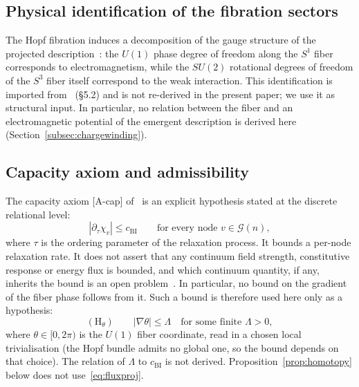 \documentclass[11pt,a4paper]{article}
\begin{document}
    \subsection{Physical identification of the fibration sectors}

      The Hopf fibration induces a decomposition of the gauge structure
      of the projected description~\cite{Cosmochrony}:
      the $U(1)$ phase degree of freedom along the $S^1$ fiber
      corresponds to electromagnetism,
      while the $SU(2)$ rotational degrees of freedom of the $S^3$ fiber
      itself correspond to the weak interaction.
      This identification is imported from~\cite{Cosmochrony} (\S5.2) and is
      not re-derived in the present paper; we use it as structural input.
      In particular, no relation between the fiber and an electromagnetic
      potential of the emergent description is derived here
      (Section~\ref{subsec:chargewinding}).

    \subsection{Capacity axiom and admissibility}

      The capacity axiom [A-cap] of~\cite{Beau2026c} is an explicit hypothesis
      stated at the discrete relational level:
      \begin{equation}
        \label{eq:flux}
        |\partial_\tau \chi_v| \leq c_{\mathrm{BI}}
        \qquad \text{for every node } v \in \mathcal{G}(n),
      \end{equation}
      where $\tau$ is the ordering parameter of the relaxation process.
      It bounds a per-node relaxation rate.
      It does not assert that any continuum field strength, constitutive
      response or energy flux is bounded, and which continuum quantity, if
      any, inherits the bound is an open problem~\cite{Beau2026c}.
      In particular, no bound on the gradient of the fiber phase follows from
      it.
      Such a bound is therefore used here only as a hypothesis:
      \begin{equation}
        \label{eq:fluxproj}
        (\mathrm{H}_\theta)\qquad
        |\nabla \theta| \leq \Lambda \quad \text{for some finite } \Lambda > 0,
      \end{equation}
      where $\theta \in [0, 2\pi)$ is the $U(1)$ fiber coordinate, read in a chosen local
      trivialisation (the Hopf bundle admits no global one, so the bound depends on that choice).
      The relation of $\Lambda$ to $c_{\mathrm{BI}}$ is not derived.
      Proposition~\ref{prop:homotopy} below does not use~\eqref{eq:fluxproj}.
\end{document}

